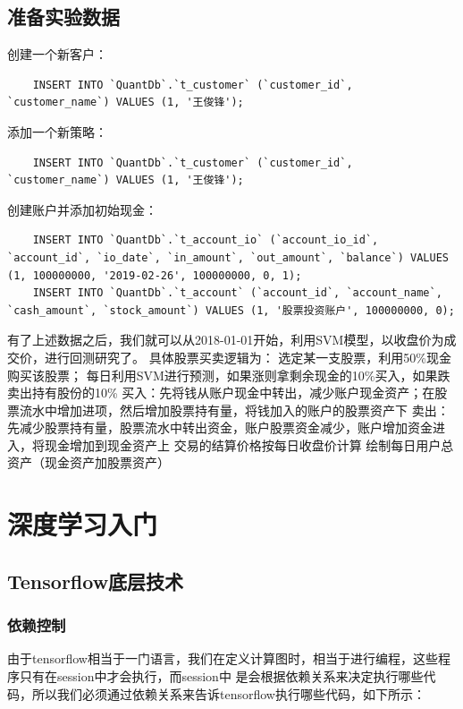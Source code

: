 \documentclass{article}
\begin{document}
\subsection{准备实验数据}
创建一个新客户：
\begin{lstlisting}
    INSERT INTO `QuantDb`.`t_customer` (`customer_id`, `customer_name`) VALUES (1, '王俊锋');
\end{lstlisting}
添加一个新策略：
\begin{lstlisting}
    INSERT INTO `QuantDb`.`t_customer` (`customer_id`, `customer_name`) VALUES (1, '王俊锋');
\end{lstlisting}
创建账户并添加初始现金：
\begin{lstlisting}
    INSERT INTO `QuantDb`.`t_account_io` (`account_io_id`, `account_id`, `io_date`, `in_amount`, `out_amount`, `balance`) VALUES (1, 100000000, '2019-02-26', 100000000, 0, 1);
    INSERT INTO `QuantDb`.`t_account` (`account_id`, `account_name`, `cash_amount`, `stock_amount`) VALUES (1, '股票投资账户', 100000000, 0);
\end{lstlisting}
有了上述数据之后，我们就可以从2018-01-01开始，利用SVM模型，以收盘价为成交价，进行回测研究了。\newline
具体股票买卖逻辑为：
选定某一支股票，利用50\%现金购买该股票；
每日利用SVM进行预测，如果涨则拿剩余现金的10\%买入，如果跌卖出持有股份的10\%
买入：先将钱从账户现金中转出，减少账户现金资产；在股票流水中增加进项，然后增加股票持有量，将钱加入的账户的股票资产下
卖出：先减少股票持有量，股票流水中转出资金，账户股票资金减少，账户增加资金进入，将现金增加到现金资产上
交易的结算价格按每日收盘价计算
绘制每日用户总资产（现金资产加股票资产）





\section{深度学习入门}
\subsection{Tensorflow底层技术}
\subsubsection{依赖控制}
由于tensorflow相当于一门语言，我们在定义计算图时，相当于进行编程，这些程序只有在session中才会执行，而session中
是会根据依赖关系来决定执行哪些代码，所以我们必须通过依赖关系来告诉tensorflow执行哪些代码，如下所示：
\end{document}
